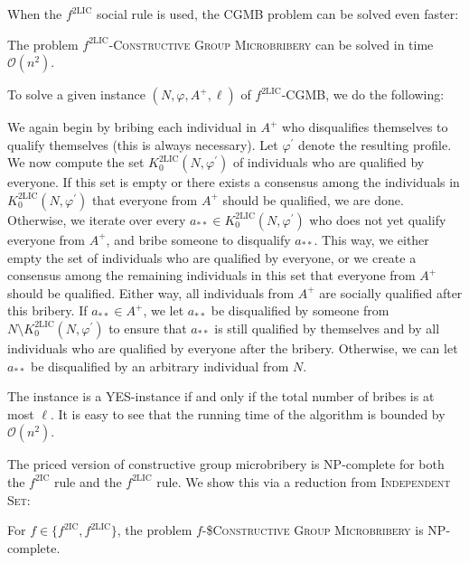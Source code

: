 \documentclass[
    12pt,               %
    a4paper,            %
    bibtotoc,           %
    pointlessnumbers,   %
    ngerman,            %
    titlepage,          %
    leqno,              %
    ]{scrarticle}       %
\begin{document}
When the $f^{\text{2LIC}}$ social rule is used, the CGMB problem can be solved even faster:

\begin{Theorem} \label{thm:2lic_cgmb_p}
The problem $f^{\text{2LIC}}$-\textsc{Constructive Group Microbribery} can be solved in time $\mathcal{O}(n^2)$.
\end{Theorem}

\begin{Proof}
To solve a given instance $(N, \varphi, A^+, \ell)$ of $f^{\text{2LIC}}$-CGMB, we do the following:

We again begin by bribing each individual in $A^+$ who disqualifies themselves to qualify themselves (this is always necessary). Let $\varphi^\prime$ denote the resulting profile. We now compute the set $K^{\text{2LIC}}_0(N, \varphi^\prime)$ of individuals who are qualified by everyone. If this set is empty or there exists a consensus among the individuals in $K^{\text{2LIC}}_0(N, \varphi^\prime)$ that everyone from $A^+$ should be qualified, we are done. Otherwise, we iterate over every $a_{\ast\ast} \in K^{\text{2LIC}}_0(N, \varphi^\prime)$ who does not yet qualify everyone from $A^+$, and bribe someone to disqualify $a_{\ast\ast}$. This way, we either empty the set of individuals who are qualified by everyone, or we create a consensus among the remaining individuals in this set that everyone from $A^+$ should be qualified. Either way, all individuals from $A^+$ are socially qualified after this bribery. If $a_{\ast\ast} \in A^+$, we let $a_{\ast\ast}$ be disqualified by someone from $N \setminus K^{\text{2LIC}}_0(N, \varphi^\prime)$ to ensure that $a_{\ast\ast}$ is still qualified by themselves and by all individuals who are qualified by everyone after the bribery. Otherwise, we can let $a_{\ast\ast}$ be disqualified by an arbitrary individual from $N$.

The instance is a YES-instance if and only if the total number of bribes is at most $\ell$. It is easy to see that the running time of the algorithm is bounded by $\mathcal{O}(n^2)$.
\end{Proof}



The priced version of constructive group microbribery is NP-complete for both the $f^{\text{2IC}}$ rule and the $f^{\text{2LIC}}$ rule. We show this via a reduction from \textsc{Independent Set}:

\begin{Theorem} \label{thm:2ic_cgmb_npc}
For $f \in \{ f^{\text{2IC}}, f^{\text{2LIC}} \}$, the problem $f$-\textsc{\$Constructive Group Microbribery} is NP-complete.
\end{Theorem}
\end{document}
